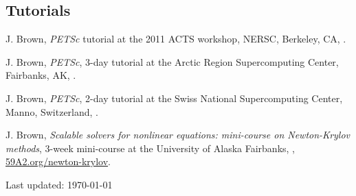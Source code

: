 \documentclass[10pt,letterpaper]{article}
\newcommand\ptitle[1]{\textit{#1}} %
\renewenvironment{itemize}{
  \begin{list}{}{
    \setlength{\leftmargin}{1.5em}
    \setlength{\itemsep}{0.25em}
    \setlength{\parskip}{0pt}
    \setlength{\parsep}{0.25em}
  }
}{
  \end{list}
}
\begin{document}
\subsection*{Tutorials}
\begin{itemize}
\item J. Brown, \ptitle{PETSc} tutorial at the 2011 ACTS workshop, NERSC, Berkeley, CA, .
\item J. Brown, \ptitle{PETSc}, 3-day tutorial at the Arctic Region Supercomputing Center, Fairbanks, AK, .
\item J. Brown, \ptitle{PETSc}, 2-day tutorial at the Swiss National Supercomputing Center, Manno, Switzerland, .
\item J. Brown, \ptitle{Scalable solvers for nonlinear equations: mini-course on Newton-Krylov methods}, 3-week mini-course at the University of Alaska Fairbanks, , \href{http://59A2.org/newton-krylov/}{\url{59A2.org/newton-krylov}}.
\end{itemize}


\begin{center}
  \begin{small}
    Last updated: \today
  \end{small}
\end{center}
\end{document}
